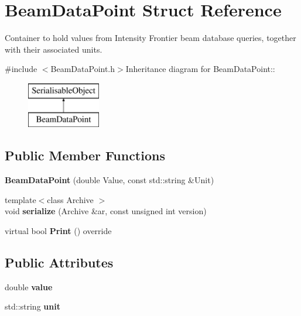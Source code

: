 \hypertarget{structBeamDataPoint}{
\section{BeamDataPoint Struct Reference}
\label{structBeamDataPoint}
}


Container to hold values from Intensity Frontier beam database queries, together with their associated units.  


{\ttfamily \#include $<$BeamDataPoint.h$>$}Inheritance diagram for BeamDataPoint::\begin{figure}[H]
\begin{center}
\leavevmode
\includegraphics[height=2cm]{structBeamDataPoint}
\end{center}
\end{figure}
\subsection*{Public Member Functions}
\begin{DoxyCompactItemize}
\item 
\hypertarget{structBeamDataPoint_ad98646938f8e5337563523d7d0a198b4}{
{\bfseries BeamDataPoint} (double Value, const std::string \&Unit)}
\label{structBeamDataPoint_ad98646938f8e5337563523d7d0a198b4}

\item 
\hypertarget{structBeamDataPoint_a4da3cbcb61af8e7acc0c5b13c0a2ec32}{
{\footnotesize template$<$class Archive $>$ }\\void {\bfseries serialize} (Archive \&ar, const unsigned int version)}
\label{structBeamDataPoint_a4da3cbcb61af8e7acc0c5b13c0a2ec32}

\item 
\hypertarget{structBeamDataPoint_aaa7b4c28dfad7d79f92c6d60001d36ac}{
virtual bool {\bfseries Print} () override}
\label{structBeamDataPoint_aaa7b4c28dfad7d79f92c6d60001d36ac}

\end{DoxyCompactItemize}
\subsection*{Public Attributes}
\begin{DoxyCompactItemize}
\item 
\hypertarget{structBeamDataPoint_ab877fc81dd293f30ec6475f9649cddd0}{
double {\bfseries value}}
\label{structBeamDataPoint_ab877fc81dd293f30ec6475f9649cddd0}

\item 
\hypertarget{structBeamDataPoint_a0a0e275d6a6bc2631c4103eb7e2b44e4}{
std::string {\bfseries unit}}
\label{structBeamDataPoint_a0a0e275d6a6bc2631c4103eb7e2b44e4}

\end{DoxyCompactItemize}
